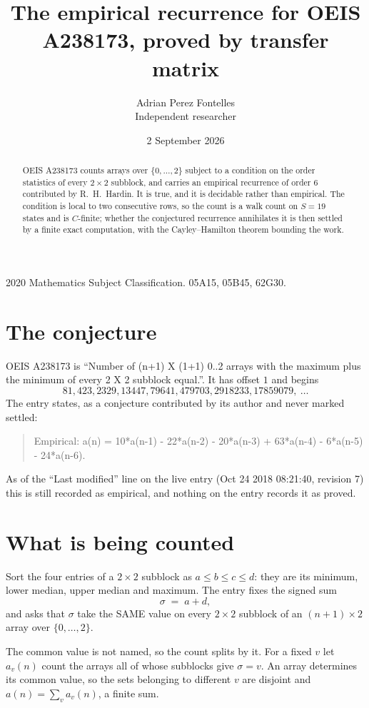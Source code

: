 \documentclass[11pt,a4paper]{article}
\title{The empirical recurrence for OEIS A238173, proved by transfer matrix}
\author{Adrian Perez Fontelles\\ \small Independent researcher}
\date{2 September 2026}
\theoremstyle{plain}
\theoremstyle{definition}
\begin{document}
\maketitle

\begin{abstract}
OEIS A238173 counts arrays over $\{0,\dots,2\}$ subject to a condition on the order
statistics of every $2\times2$ subblock, and carries an empirical recurrence of order
$6$ contributed by R.~H.~Hardin. It is true, and it is decidable rather than empirical.
The condition is local to two consecutive rows, so the count is a walk count on $S=19$
states and is $C$-finite; whether the conjectured recurrence annihilates it is then settled by
a finite exact computation, with the Cayley--Hamilton theorem bounding the work.
\end{abstract}

\noindent\small 2020 Mathematics Subject Classification. 05A15, 05B45, 62G30.\normalsize

\section{The conjecture}

OEIS A238173 is ``Number of (n+1) X (1+1) 0..2 arrays with the maximum plus the minimum of every 2 X 2 subblock equal.''. It has offset $1$ and begins
\[
81, 423, 2329, 13447, 79641, 479703, 2918233, 17859079,\ \dots
\]
The entry states, as a conjecture contributed by its author and never marked settled:
\begin{quote}
Empirical: a(n) = 10*a(n-1) - 22*a(n-2) - 20*a(n-3) + 63*a(n-4) - 6*a(n-5) - 24*a(n-6).
\end{quote}
As of the ``Last modified'' line on the live entry (Oct 24 2018 08:21:40, revision 7) this is still
recorded as empirical, and nothing on the entry records it as proved.

\section{What is being counted}

Sort the four entries of a $2\times2$ subblock as $a\le b\le c\le d$: they
are its minimum, lower median, upper median and maximum. The entry fixes the signed sum
\[
\sigma\;=\;a+d,
\]
and asks that $\sigma$ take the SAME value on every $2\times2$ subblock of an
$(n+1)\times2$ array over $\{0,\dots,2\}$.

The common value is not named, so the count splits by it. For a fixed $v$ let $a_v(n)$ count
the arrays all of whose subblocks give $\sigma=v$. An array determines its common value, so
the sets belonging to different $v$ are disjoint and $a(n)=\sum_v a_v(n)$, a finite sum.
\end{document}
